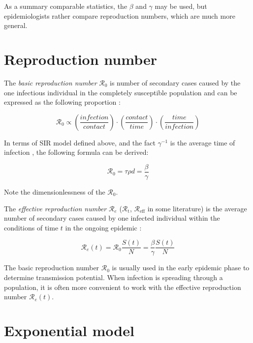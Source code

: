 \documentclass[
  digital, %
  oneside, %
  lof,     %
  lot,     %
]{fithesis4}
\begin{document}
As a summary comparable statistics, the $\beta$ and $\gamma$
may be used, but epidemiologists rather compare 
reproduction numbers, which are much more general.


\section{Reproduction number}

The \textit{basic reproduction number} $\mathcal{R}_0$ is number 
of secondary cases caused by the one infectious individual 
in the completely susceptible population and can be expressed
as the following proportion \cite{jones2007}:

\begin{equation}
	\mathcal{R}_0 \propto \left(\frac{infection}{contact}\right)\cdot\left(\frac{contact}{time}\right)\cdot\left(\frac{time}{infection}\right)  
\end{equation}

In terms of SIR model defined above, and the fact $\gamma^{-1}$ is 
the average time of infection \cite{ma2019}, the following formula can be derived:

\begin{equation}
	\mathcal{R}_0 = \tau \rho d = \frac{\beta}{\gamma}
\end{equation}

Note the dimensionlessness of the $\mathcal{R}_0$.

The \textit{effective reproduction number} $\mathcal{R}_e$ 
($\mathcal{R}_{\text{t}}$, $\mathcal{R}_{\text{eff}}$ in 
some literature) is the average number of secondary cases 
caused by one infected individual within the 
conditions of time $t$ in the ongoing epidemic \cite{chowell2016}:

\begin{equation}
  \label{eq:sir-effective-reproduction-number}
	\mathcal{R}_e(t) = \mathcal{R}_0 \frac{S(t)}{N} = \frac{\beta}{\gamma} \frac{S(t)}{N}
\end{equation}

The basic reproduction number $\mathcal{R}_0$ is usually used
in the early epidemic phase to determine transmission potential.
When infection is
spreading through a population, it is often more convenient
to work with the effective reproduction number $\mathcal{R}_e(t)$.


\section{Exponential model}
\end{document}
